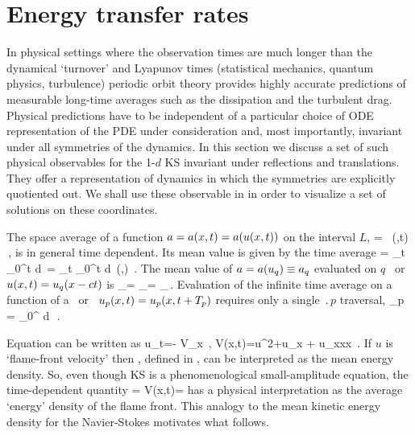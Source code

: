 \section{Energy transfer rates}
\label{sec:energy}

In physical settings where the observation times are much longer than
the dynamical `turnover' and Lyapunov times (statistical mechanics,
quantum physics, turbulence) periodic orbit theory provides
highly accurate predictions of measurable long-time averages such as
the dissipation and the turbulent drag. Physical predictions have to be
independent of a particular choice of ODE representation of the PDE
under consideration and, most importantly, invariant under all
symmetries of the dynamics. In this section we discuss a set of such
physical observables for the  1-$d$ KS invariant under reflections and
translations. They offer a representation of dynamics in which the
symmetries are explicitly quotiented out. We shall use these observable in
 in order to visualize a set of solutions on
these coordinates.

The {space average} of a function $a = a(x,t) = a(u(x,t))$  on
the interval $L$,
\beq
    \expct{\obser} = \Lint{\pSpace}\, \obser(\pSpace,t)
    \,,
    \label{rpo:spac_ave}
\eeq
is in general time dependent.
Its mean value is given by the {time average}
\beq
\timeAver{\obser}
    =
\lim_{t\rightarrow \infty}  \int_0^t \! d\tau \, \expct{\obser}
    =
\lim_{t\rightarrow \infty}  \int_0^t \!
    \Lint{\tau}  d\pSpace\, \obser(\pSpace,\tau)
    \,.
\label{rpo:tim_ave}
\eeq
The mean value of $a = a(u_q) \equiv a_q$ evaluated on $q$
\eqv\ or {\reqv} $u(x,t) = u_q(x-ct)$ is
\beq
\timeAver{\obser}_\stagn = \expct{\obser}_\stagn = \obser_\stagn\,.
\label{rpo:u-eqv} \eeq Evaluation of the infinite time average
 on a function of a \po\ or \rpo\
$u_p(x,t)=u_p(x,t+{T_{p}})$ requires only a single
$\period{p}$ traversal,
\beq
  \timeAver{\obser}_p = 
    \int_0^{\period{p}} \! d\tau \, \expct{\obser}
\,.
\label{rpo:u-cyc}
\eeq

Equation  can be written as
\beq
    u_t=- V_x
        \,,\qquad
    V(x,t)={\textstyle{}}u^2+u_{x} + u_{xxx}
    \,.
 If $u$ is `flame-front velocity' then \expctE, defined in
\refeq{eq:stdks}, can be interpreted as the mean energy density.
So, even though KS is a phenomenological
small-amplitude equation, the time-dependent quantity
\beq
    \expctE=
  \Lint{\pSpace}
  V(x,t)=
  \Lint{\pSpace} 
  \label{ksEnergy} \eeq
has a physical interpretation as the average `energy'
density of the flame front. This analogy to the mean kinetic energy
density for the Navier-Stokes motivates what follows.

